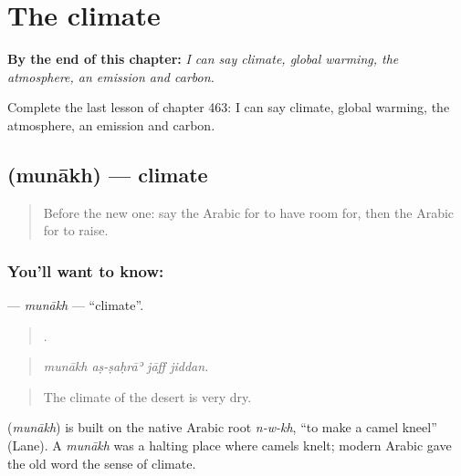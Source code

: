 
\chapter{The climate}
\label{ch:ar-the-climate}

\begin{chapteropening}
\textbf{By the end of this chapter:} \emph{I can say climate, global warming, the atmosphere, an emission and carbon.}

Complete the last lesson of chapter 463: I can say climate, global warming, the atmosphere, an emission and carbon.
\end{chapteropening}

\section[\texorpdfstring{\ar{مناخ} (munākh)}{مناخ (munākh)}]{ (munākh) — climate}

\label{lesson:AR-C463-munakh}



\begin{quote}
Before the new one: say the Arabic for to have room for, then the Arabic for to raise.
\end{quote}

\subsection*{You'll want to know: }
\textbf{} — \emph{munākh} — \textquotedblleft{}climate\textquotedblright{}.

\begin{quote}
   .
\end{quote}

\begin{quote}
\emph{munākh aṣ-ṣaḥrāʾ jāff jiddan.}
\end{quote}

\begin{quote}
The climate of the desert is very dry.
\end{quote}

\begin{cousinweb}
\textbf{} (\emph{munākh}) is built on the native Arabic root \emph{n-w-kh}, \textquotedblleft{}to make a camel kneel\textquotedblright{} (Lane). A \emph{munākh} was a halting place where camels knelt; modern Arabic gave the old word the sense of climate.
\end{cousinweb}

